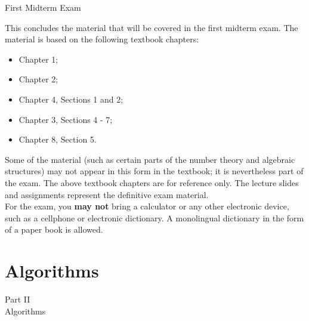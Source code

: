 \documentclass[smaller,hyperref={CJKbookmarks=true}]{beamer}
\begin{document}
\begin{frame}[t]{First Midterm Exam}
\begin{spacing}{1}
This concludes the material that will be covered in the first midterm exam.
The material is based on the following textbook chapters:
\begin{itemize}
  \item Chapter 1;
  \item Chapter 2;
  \item Chapter 4, Sections 1 and 2;
  \item Chapter 3, Sections 4 - 7;
  \item Chapter 8, Section 5.
\end{itemize}
Some of the material (such as certain parts of the number theory and
algebraic structures) may not appear in this form in the textbook; it is
nevertheless part of the exam. The above textbook chapters are for
reference only. The lecture slides and assignments represent the definitive
exam material.\\[5pt]
For the exam, you \textcolor[rgb]{1.00,0.00,0.00}{\textbf{may not}} bring a calculator or any other electronic
device, such as a cellphone or electronic dictionary. A monolingual
dictionary in the form of a paper book is allowed.
\end{spacing}
\end{frame}
\section{Algorithms}
\begin{frame}
\begin{center}
  \LARGE{Part II}\\ \alert{Algorithms}
\end{center}
\end{frame}
\begin{frame} \begin{spacing}{2.5}
\tableofcontents[currentsubsection,hideothersubsections,sectionstyle=hide]
\end{spacing}
\end{frame}
\end{document}

